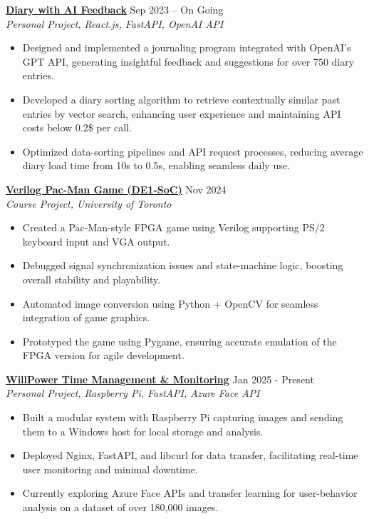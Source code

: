 \documentclass[letterpaper,10pt]{article}
\begin{document}
\vspace{0.3cm}
\noindent\href{https://github.com/Ken-2511/Diary-with-ChatGPT-Comment}{\uline{
\textbf{Diary with AI Feedback}}} \hfill Sep 2023 -- On Going\\
\textit{Personal Project, React.js, FastAPI, OpenAI API}
\begin{itemize}[leftmargin=0.2in]
    \item Designed and implemented a journaling program integrated with OpenAI’s GPT API, generating insightful feedback and suggestions for over 750 diary entries.
    \item Developed a diary sorting algorithm to retrieve contextually similar past entries by vector search, enhancing user experience and maintaining API costs below 0.2\$ per call.
    \item Optimized data-sorting pipelines and API request processes, reducing average diary load time from 10s to 0.5s, enabling seamless daily use.
\end{itemize}


\vspace{0.3cm}
\noindent\href{https://github.com/Ken-2511/ECE241-Project}{\uline{
\textbf{Verilog Pac-Man Game (DE1-SoC)}}} \hfill Nov 2024\\
\textit{Course Project, University of Toronto}
\begin{itemize}[leftmargin=0.2in]
    \item Created a Pac-Man-style FPGA game using Verilog supporting PS/2 keyboard input and VGA output.
    \item Debugged signal synchronization issues and state-machine logic, boosting overall stability and playability.
    \item Automated image conversion using Python + OpenCV for seamless integration of game graphics.
    \item Prototyped the game using Pygame, ensuring accurate emulation of the FPGA version for agile development.
\end{itemize}

\vspace{0.3cm}
\noindent\href{https://github.com/Ken-2511/WillPower}{\uline{
\textbf{WillPower \textbar{} Time Management \& Monitoring}}} \hfill Jan 2025 - Present\\
\textit{Personal Project, Raspberry Pi, FastAPI, Azure Face API}
\begin{itemize}[leftmargin=0.2in]
    \item Built a modular system with Raspberry Pi capturing images and sending them to a Windows host for local storage and analysis.
    \item Deployed Nginx, FastAPI, and libcurl for data transfer, facilitating real-time user monitoring and minimal downtime.
    \item Currently exploring Azure Face APIs and transfer learning for user-behavior analysis on a dataset of over 180,000 images.
\end{itemize}
\end{document}
